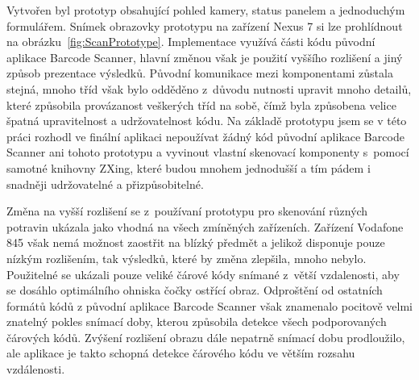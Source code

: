 \documentclass[thesis=B,czech]{FITthesis}[2013/10/20]
\begin{document}
Vytvořen byl prototyp obsahující pohled kamery, status panelem a jednoduchým formulářem. Snímek obrazovky prototypu na zařízení Nexus 7 si lze prohlídnout na obrázku~\ref{fig:ScanPrototype}. Implementace využívá části kódu původní aplikace Barcode Scanner, hlavní změnou však je použití vyššího rozlišení a jiný způsob prezentace výsledků. Původní komunikace mezi komponentami zůstala stejná, mnoho tříd však bylo odděděno z~důvodu nutnosti upravit mnoho detailů, které způsobila provázanost veškerých tříd na sobě, čímž byla způsobena velice špatná upravitelnost a udržovatelnost kódu. Na základě prototypu jsem se v této práci rozhodl ve finální aplikaci nepoužívat žádný kód původní aplikace Barcode Scanner ani tohoto prototypu a vyvinout vlastní skenovací komponenty s~pomocí samotné knihovny ZXing, které budou mnohem jednodušší a tím pádem i snadněji udržovatelné a přizpůsobitelné.

Změna na vyšší rozlišení se z~používaní prototypu pro skenování různých potravin ukázala jako vhodná na všech zmíněných zařízeních. Zařízení Vodafone 845 však nemá možnost zaostřit na blízký předmět a jelikož disponuje pouze nízkým rozlišením, tak výsledků, které by změna zlepšila, mnoho nebylo. Použitelné se ukázali pouze veliké čárové kódy snímané z~větší vzdalenosti, aby se dosáhlo optimálního ohniska čočky ostřící obraz. Odproštění od ostatních formátů kódů z původní aplikace Barcode Scanner však znamenalo pocitově velmi znatelný pokles snímací doby, kterou způsobila detekce všech podporovaných čárových kódů. Zvýšení rozlišení obrazu dále nepatrně snímací dobu prodloužilo, ale aplikace je takto schopná detekce čárového kódu ve větším rozsahu vzdálenosti.
\end{document}
